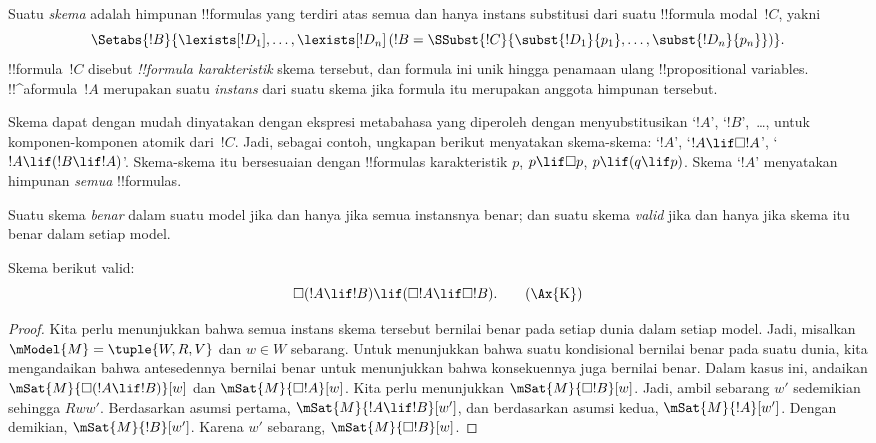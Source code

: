 \documentclass[../../../include/open-logic-section]{subfiles}
\begin{document}


\begin{defn}
  Suatu \emph{skema} adalah himpunan !!{formula}s yang terdiri atas semua
  dan hanya instans substitusi dari suatu !!{formula} modal~$!C$, yakni
  \[
  \Setabs{!B}{\lexists[!D_1], \dots, \lexists[!D_n] \left(!B =
  \SSubst{!C}{\subst{!D_1}{p_1}, \dots, \subst{!D_n}{p_n}} \right) }.
  \]
  !!{formula}~$!C$ disebut \emph{!!{formula} karakteristik} skema tersebut,
  dan formula ini unik hingga penamaan ulang !!{propositional
  variable}s.
  !!^a{formula}~$!A$ merupakan suatu \emph{instans} dari suatu skema jika
  formula itu merupakan anggota himpunan tersebut.
\end{defn}

Skema dapat dengan mudah dinyatakan dengan ekspresi metabahasa yang diperoleh
dengan menyubstitusikan `$!A$', `$!B$',~\dots, untuk komponen-komponen atomik
dari~$!C$. Jadi, sebagai contoh, ungkapan berikut menyatakan skema-skema:
`$!A$', `$!A \lif \Box!A$', `$!A \lif (!B \lif !A)$'. Skema-skema itu
bersesuaian dengan !!{formula}s karakteristik $p$, $p \lif \Box p$, $p \lif
(q \lif p)$. Skema `$!A$' menyatakan himpunan \emph{semua} !!{formula}s.

\begin{defn}
  Suatu skema \emph{benar} dalam suatu model jika dan hanya jika semua
  instansnya benar; dan suatu skema \emph{valid} jika dan hanya jika skema itu
  benar dalam setiap model.
\end{defn}

\begin{prop}
  Skema  berikut valid:
  \begin{equation*}
  \Box(!A \lif !B) \lif (\Box !A \lif \Box !B). \tag{\Ax{K}}
  \end{equation*}
\end{prop}

\begin{proof}
  Kita perlu menunjukkan bahwa semua instans skema tersebut bernilai benar
  pada setiap dunia dalam setiap model. Jadi, misalkan
  $\mModel{M} = \tuple{W,R,V}$ dan $w \in W$ sebarang. Untuk menunjukkan
  bahwa suatu kondisional bernilai benar pada suatu dunia, kita mengandaikan
  bahwa antesedennya bernilai benar untuk menunjukkan bahwa konsekuennya juga
  bernilai benar. Dalam kasus ini, andaikan
  $\mSat{M}{\Box(!A \lif !B)}[w]$ dan $\mSat{M}{\Box !A}[w]$. Kita perlu
  menunjukkan $\mSat{M}{\Box !B}[w]$. Jadi, ambil sebarang $w'$ sedemikian
  sehingga $Rww'$. Berdasarkan asumsi pertama, $\mSat{M}{!A \lif !B}[w']$,
  dan berdasarkan asumsi kedua, $\mSat{M}{!A}[w']$. Dengan demikian,
  $\mSat{M}{!B}[w']$. Karena $w'$ sebarang, $\mSat{M}{\Box !B}[w]$.
\end{proof}
\end{document}
